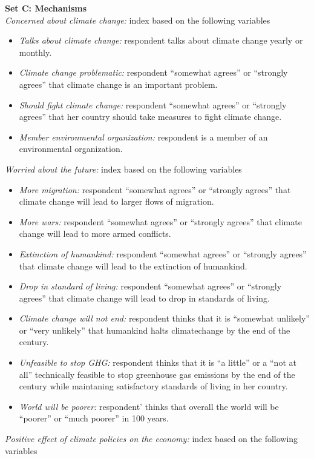 \documentclass{article}
\begin{document}
\noindent \textbf{Set C: Mechanisms}\\
\textit{Concerned about climate change:} index based on the following variables
\begin{itemize}
	\item \textit{Talks about climate change:} respondent talks about climate change yearly or monthly.
	\item \textit{Climate change problematic:} respondent ``somewhat agrees'' or ``strongly agrees'' that climate change is an important problem.
	\item \textit{Should fight climate change:} respondent ``somewhat agrees'' or ``strongly agrees'' that her country should take measures to fight climate change.
	\item \textit{Member environmental organization:} respondent is a member of an environmental organization.
\end{itemize}
\textit{Worried about the future:} index based on the following variables
\begin{itemize}
	\item \textit{More migration:} respondent ``somewhat agrees'' or ``strongly agrees'' that climate change will lead to larger flows of migration.
	\item \textit{More wars:} respondent ``somewhat agrees'' or ``strongly agrees'' that climate change will lead to more armed conflicts.
	\item \textit{Extinction of humankind:} respondent ``somewhat agrees'' or ``strongly agrees'' that climate change will lead to the extinction of humankind.
	\item \textit{Drop in standard of living:} respondent ``somewhat agrees'' or ``strongly agrees'' that climate change will lead to drop in standards of living.
	\item \textit{Climate change will not end:} respondent thinks that it is ``somewhat unlikely'' or ``very unlikely'' that humankind halts climatechange by the end of the century.
	\item \textit{Unfeasible to stop GHG:} respondent thinks that it is ``a little'' or a ``not at all'' technically feasible to stop greenhouse gas emissions by the end of the century while maintaning satisfactory standards of living in her country.
	\item \textit{World will be poorer:} respondent' thinks that overall the world will be ``poorer'' or ``much poorer'' in 100 years.
\end{itemize}
\textit{Positive effect of climate policies on the economy:} index based on the following variables
\end{document}
